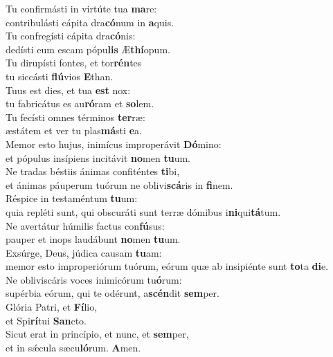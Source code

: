\evenverse Tu confirmásti in virtúte tua \textbf{ma}re:~\*\\
\evenverse contribulásti cápita dra\textbf{có}num in \textbf{a}quis.\\
\oddverse Tu confregísti cápita dra\textbf{có}nis:~\*\\
\oddverse dedísti eum escam pópu\textbf{lis} Æ\textbf{thí}opum.\\
\evenverse Tu dirupísti fontes, et tor\textbf{rén}tes~\*\\
\evenverse tu siccásti \textbf{flú}vios \textbf{E}than.\\
\oddverse Tuus est dies, et tua \textbf{est} nox:~\*\\
\oddverse tu fabricátus es au\textbf{ró}ram et \textbf{so}lem.\\
\evenverse Tu fecísti omnes términos \textbf{ter}ræ:~\*\\
\evenverse æstátem et ver tu plas\textbf{má}sti \textbf{e}a.\\
\oddverse Memor esto hujus, inimícus improperávit \textbf{Dó}mino:~\*\\
\oddverse et pópulus insípiens incitávit \textbf{no}men \textbf{tu}um.\\
\evenverse Ne tradas béstiis ánimas confiténtes \textbf{ti}bi,~\*\\
\evenverse et ánimas páuperum tuórum ne oblivi\textbf{scá}ris in \textbf{fi}nem.\\
\oddverse Réspice in testaméntum \textbf{tu}um:~\*\\
\oddverse quia repléti sunt, qui obscuráti sunt terræ dómibus i\textbf{ni}qui\textbf{tá}tum.\\
\evenverse Ne avertátur húmilis factus con\textbf{fú}sus:~\*\\
\evenverse pauper et inops laudábunt \textbf{no}men \textbf{tu}um.\\
\oddverse Exsúrge, Deus, júdica causam \textbf{tu}am:~\*\\
\oddverse memor esto improperiórum tuórum, eórum quæ ab insipiénte sunt \textbf{to}ta \textbf{di}e.\\
\evenverse Ne obliviscáris voces inimicórum tu\textbf{ó}rum:~\*\\
\evenverse supérbia eórum, qui te odérunt, a\textbf{scén}dit \textbf{sem}per.\\
\oddverse Glória Patri, et \textbf{Fí}lio,~\*\\
\oddverse et Spi\textbf{rí}tui \textbf{San}cto.\\
\evenverse Sicut erat in princípio, et nunc, et \textbf{sem}per,~\*\\
\evenverse et in sǽcula sæcu\textbf{ló}rum. \textbf{A}men.\\
